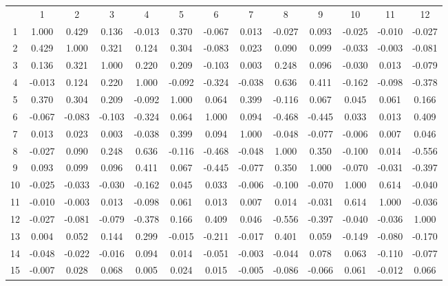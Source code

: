 \documentclass[ %
                    author={Sam Phippen},
                supervisor={Dr. Rafal Bogacz},
                     title={Real time voice activity detectors in noisy personal computing environments},
                  subtitle={},
                    degree={MEng},
                      year={2012} ]{thesis}
\begin{document}
\begin{table}
    \begin{tabular}{ccccccccccccc}
           & 1      & 2      & 3      & 4      & 5      & 6      & 7      & 8      & 9      & 10     & 11     & 12     \\
        1  & 1.000  & 0.429  & 0.136  & -0.013 & 0.370  & -0.067 & 0.013  & -0.027 & 0.093  & -0.025 & -0.010 & -0.027 \\
        2  & 0.429  & 1.000  & 0.321  & 0.124  & 0.304  & -0.083 & 0.023  & 0.090  & 0.099  & -0.033 & -0.003 & -0.081 \\
        3  & 0.136  & 0.321  & 1.000  & 0.220  & 0.209  & -0.103 & 0.003  & 0.248  & 0.096  & -0.030 & 0.013  & -0.079 \\
        4  & -0.013 & 0.124  & 0.220  & 1.000  & -0.092 & -0.324 & -0.038 & 0.636  & 0.411  & -0.162 & -0.098 & -0.378 \\
        5  & 0.370  & 0.304  & 0.209  & -0.092 & 1.000  & 0.064  & 0.399  & -0.116 & 0.067  & 0.045  & 0.061  & 0.166  \\
        6  & -0.067 & -0.083 & -0.103 & -0.324 & 0.064  & 1.000  & 0.094  & -0.468 & -0.445 & 0.033  & 0.013  & 0.409  \\
        7  & 0.013  & 0.023  & 0.003  & -0.038 & 0.399  & 0.094  & 1.000  & -0.048 & -0.077 & -0.006 & 0.007  & 0.046  \\
        8  & -0.027 & 0.090  & 0.248  & 0.636  & -0.116 & -0.468 & -0.048 & 1.000  & 0.350  & -0.100 & 0.014  & -0.556 \\
        9  & 0.093  & 0.099  & 0.096  & 0.411  & 0.067  & -0.445 & -0.077 & 0.350  & 1.000  & -0.070 & -0.031 & -0.397 \\
        10 & -0.025 & -0.033 & -0.030 & -0.162 & 0.045  & 0.033  & -0.006 & -0.100 & -0.070 & 1.000  & 0.614  & -0.040 \\
        11 & -0.010 & -0.003 & 0.013  & -0.098 & 0.061  & 0.013  & 0.007  & 0.014  & -0.031 & 0.614  & 1.000  & -0.036 \\
        12 & -0.027 & -0.081 & -0.079 & -0.378 & 0.166  & 0.409  & 0.046  & -0.556 & -0.397 & -0.040 & -0.036 & 1.000  \\
        13 & 0.004  & 0.052  & 0.144  & 0.299  & -0.015 & -0.211 & -0.017 & 0.401  & 0.059  & -0.149 & -0.080 & -0.170 \\
        14 & -0.048 & -0.022 & -0.016 & 0.094  & 0.014  & -0.051 & -0.003 & -0.044 & 0.078  & 0.063  & -0.110 & -0.077 \\
        15 & -0.007 & 0.028  & 0.068  & 0.005  & 0.024  & 0.015  & -0.005 & -0.086 & -0.066 & 0.061  & -0.012 & 0.066  \\

\end{tabular}
\end{table}
\end{document}
